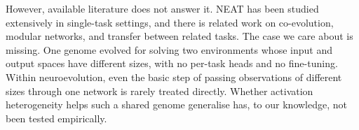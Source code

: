 \documentclass[12pt]{article}
\begin{document}

% 

However, available literature does not answer it.
NEAT has been studied extensively in single-task settings, and there is related work on co-evolution, modular networks, and transfer between related tasks.
The case we care about is missing. One genome evolved for solving two environments whose input and output spaces have different sizes, with no per-task heads and no fine-tuning.
Within neuroevolution, even the basic step of passing observations of different sizes through one network is rarely treated directly. 
Whether activation heterogeneity helps such a shared genome generalise has, to our knowledge, not been tested empirically.
\end{document}
